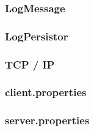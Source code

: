 \subsubsection{LogMessage}
\subsubsection{LogPersistor}
\subsubsection{TCP / IP}
\subsubsection{client.properties}
\subsubsection{server.properties}